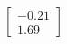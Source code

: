 \documentclass[preview]{standalone}
\begin{document}
\begin{align*}
\begin{bmatrix} -0.21 \\ 1.69 \end{bmatrix}
\end{align*}
\end{document}
